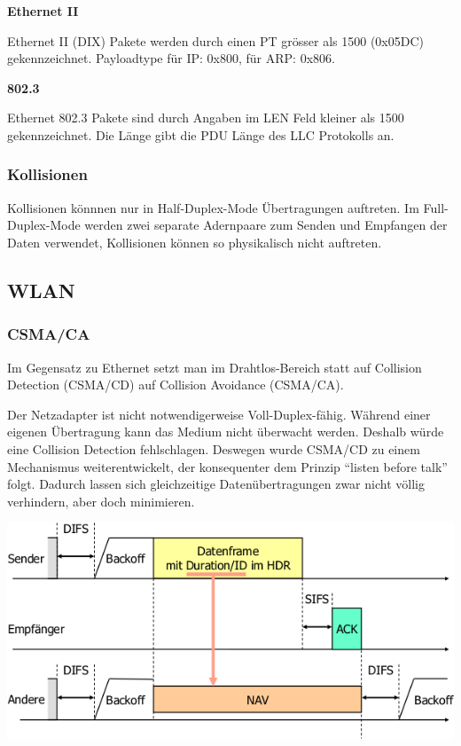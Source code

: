 \textbf{Ethernet II}

Ethernet II (DIX) Pakete werden durch einen PT grösser als 1500
(0x05DC) gekennzeichnet. Payloadtype für IP: 0x800, für ARP: 0x806.

\textbf{802.3}

Ethernet 802.3 Pakete sind durch Angaben im LEN Feld kleiner als 1500
gekennzeichnet. Die Länge gibt die PDU Länge des LLC Protokolls an.


\subsubsection{Kollisionen}

Kollisionen könnnen nur in Half-Duplex-Mode Übertragungen auftreten. Im
Full-Duplex-Mode werden zwei separate Adernpaare zum Senden und Empfangen der
Daten verwendet, Kollisionen können so physikalisch nicht auftreten.


\subsection{WLAN}

\subsubsection{CSMA/CA}

Im Gegensatz zu Ethernet setzt man im Drahtlos-Bereich statt auf Collision
Detection (CSMA/CD) auf Collision Avoidance (CSMA/CA).

Der Netzadapter ist nicht notwendigerweise Voll-Duplex-fähig. Während einer
eigenen Übertragung kann das Medium nicht überwacht werden. Deshalb würde eine
Collision Detection fehlschlagen. Deswegen wurde CSMA/CD zu einem Mechanismus
weiterentwickelt, der konsequenter dem Prinzip ``listen before talk'' folgt.
Dadurch lassen sich gleichzeitige Datenübertragungen zwar nicht völlig
verhindern, aber doch minimieren.

\begin{center}
	\includegraphics[width=.8\textwidth]{media/csma_ca.png}
\end{center}

